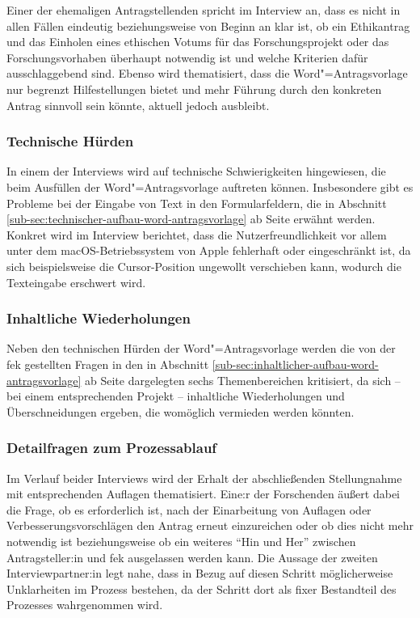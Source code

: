 \documentclass[a4paper,12pt,twoside,numbers=noendperiod]{scrreprt}
\begin{document}
Einer der ehemaligen Antragstellenden spricht im Interview an, dass es nicht in allen Fällen eindeutig beziehungsweise von Beginn an klar ist, ob ein Ethikantrag und das Einholen eines ethischen Votums für das Forschungsprojekt oder das Forschungsvorhaben überhaupt notwendig ist und welche Kriterien dafür ausschlaggebend sind. Ebenso wird thematisiert, dass die Word"=Antragsvorlage nur begrenzt Hilfestellungen bietet und mehr Führung durch den konkreten Antrag sinnvoll sein könnte, aktuell jedoch ausbleibt.

\subsubsection*{Technische Hürden}
\label{sub-sub-sec:technische-hürden}

In einem der Interviews wird auf technische Schwierigkeiten hingewiesen, die beim Ausfüllen der Word"=Antragsvorlage auftreten können. Insbesondere gibt es Probleme bei der Eingabe von Text in den Formularfeldern, die in Abschnitt \ref{sub-sec:technischer-aufbau-word-antragsvorlage} ab Seite \pageref{sub-sec:technischer-aufbau-word-antragsvorlage} erwähnt werden. Konkret wird im Interview berichtet, dass die Nutzerfreundlichkeit vor allem unter dem macOS-Betriebssystem von Apple fehlerhaft oder eingeschränkt ist, da sich beispielsweise die Cursor-Position ungewollt verschieben kann, wodurch die Texteingabe erschwert wird.

\subsubsection*{Inhaltliche Wiederholungen}
\label{sub-sub-sec:inhaltliche-wiederholungen}

Neben den technischen Hürden der Word"=Antragsvorlage werden die von der \ac{fek} gestellten Fragen in den in Abschnitt \ref{sub-sec:inhaltlicher-aufbau-word-antragsvorlage} ab Seite \pageref{sub-sec:inhaltlicher-aufbau-word-antragsvorlage} dargelegten sechs Themenbereichen kritisiert, da sich -- bei einem entsprechenden Projekt -- inhaltliche Wiederholungen und Überschneidungen ergeben, die womöglich vermieden werden könnten.

\subsubsection*{Detailfragen zum Prozessablauf}
\label{sub-sub-sec:detailfragen-prozessablauf}

Im Verlauf beider Interviews wird der Erhalt der abschließenden Stellungnahme mit entsprechenden Auflagen thematisiert. Eine:r der Forschenden äußert dabei die Frage, ob es erforderlich ist, nach der Einarbeitung von Auflagen oder Verbesserungsvorschlägen den Antrag erneut einzureichen oder ob dies nicht mehr notwendig ist beziehungsweise ob ein weiteres \enquote{Hin und Her} zwischen Antragsteller:in und \ac{fek} ausgelassen werden kann. Die Aussage der zweiten Interviewpartner:in legt nahe, dass in Bezug auf diesen Schritt möglicherweise Unklarheiten im Prozess bestehen, da der Schritt dort als fixer Bestandteil des Prozesses wahrgenommen wird.
\end{document}
